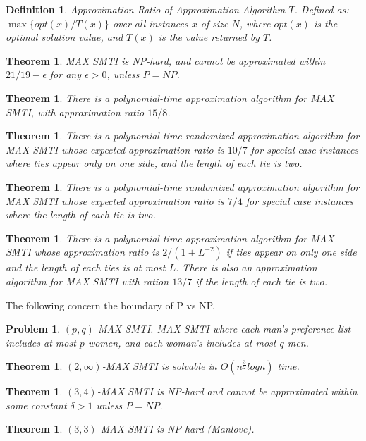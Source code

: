 \documentclass{article}
\newtheorem{theorem}[fact]{Theorem}
\newtheorem{definition}[fact]{Definition}
\newtheorem{problem}[fact]{Problem}
\begin{document}
\begin{definition}
Approximation Ratio of Approximation Algorithm $T$. Defined as: $\max\{opt(x)/T(x)\}$ over all instances $x$ of size $N$, where $opt(x)$ is the optimal solution value, and $T(x)$ is the value returned by $T$.
\end{definition}
\begin{theorem}
MAX SMTI is NP-hard, and cannot be approximated within $21/19 - \epsilon$ for any $\epsilon > 0$, unless $P = NP$.
\end{theorem}
\begin{theorem}
There is a polynomial-time approximation algorithm for MAX SMTI, with approximation ratio $15/8$.
\end{theorem}
\begin{theorem}
There is a polynomial-time randomized approximation algorithm for MAX SMTI whose expected approximation ratio is $10/7$ for special case instances where ties appear only on one side, and the length of each tie is two.
\end{theorem}
\begin{theorem}
There is a polynomial-time randomized approximation algorithm for MAX SMTI whose expected approximation ratio is $7/4$ for special case instances where the length of each tie is two.
\end{theorem}
\begin{theorem}
There is a polynomial time approximation algorithm for MAX SMTI whose approximation ratio is $2/(1 + L^{-2})$ if ties appear on only one side and the length of each ties is at most $L$. There is also an approximation algorithm for MAX SMTI with ration $13/7$ if the length of each tie is two.
\end{theorem}
The following concern the boundary of P vs NP.
\begin{problem}
$(p,q)$-MAX SMTI. MAX SMTI where each man's preference list includes at most $p$ women, and each woman's includes at most $q$ men.
\end{problem}
\begin{theorem}
$(2,\infty)$-MAX SMTI is solvable in $O(n^{\frac{3}{2}}log n)$ time.
\end{theorem}
\begin{theorem}
$(3,4)$-MAX SMTI is NP-hard and cannot be approximated within some constant $\delta > 1$ unless $P=NP$.
\end{theorem}
\begin{theorem}
$(3,3)$-MAX SMTI is NP-hard (Manlove).
\end{theorem}
\end{document}
